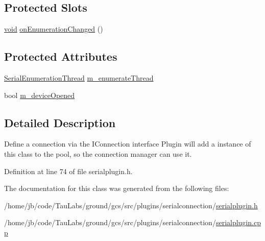 \subsection*{\-Protected \-Slots}
\begin{DoxyCompactItemize}
\item 
\hyperlink{group___u_a_v_objects_plugin_ga444cf2ff3f0ecbe028adce838d373f5c}{void} \hyperlink{group___serial_plugin_gaa86538693d05fa3051ffebb2821d40fd}{on\-Enumeration\-Changed} ()
\end{DoxyCompactItemize}
\subsection*{\-Protected \-Attributes}
\begin{DoxyCompactItemize}
\item 
\hyperlink{class_serial_enumeration_thread}{\-Serial\-Enumeration\-Thread} \hyperlink{group___serial_plugin_ga5895d83033636cc3832bd9478f4415f7}{m\-\_\-enumerate\-Thread}
\item 
bool \hyperlink{group___serial_plugin_gac430f3139892f313e094560f5e2e72d1}{m\-\_\-device\-Opened}
\end{DoxyCompactItemize}


\subsection{\-Detailed \-Description}
\-Define a connection via the \-I\-Connection interface \-Plugin will add a instance of this class to the pool, so the connection manager can use it. 

\-Definition at line 74 of file serialplugin.\-h.



\-The documentation for this class was generated from the following files\-:\begin{DoxyCompactItemize}
\item 
/home/jb/code/\-Tau\-Labs/ground/gcs/src/plugins/serialconnection/\hyperlink{serialplugin_8h}{serialplugin.\-h}\item 
/home/jb/code/\-Tau\-Labs/ground/gcs/src/plugins/serialconnection/\hyperlink{serialplugin_8cpp}{serialplugin.\-cpp}\end{DoxyCompactItemize}
